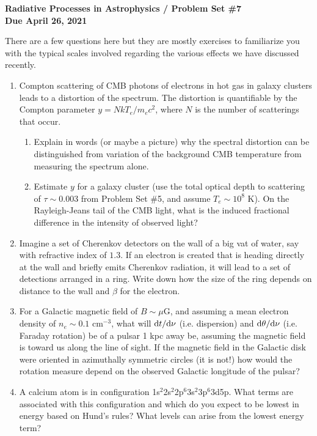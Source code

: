 \documentclass[11pt, preprint]{article}
\begin{document}
\begin{center}
  {\bf Radiative Processes in Astrophysics / Problem Set \#7 \\
    Due April 26, 2021}
\end{center}

There are a few questions here but they are mostly exercises to
familiarize you with the typical scales involved regarding the various
effects we have discussed recently.

\begin{enumerate}
\item Compton scattering of CMB photons of electrons in hot gas in
  galaxy clusters leads to a distortion of the spectrum. The
  distortion is quantifiable by the Compton parameter $y=N kT_e /
  m_ec^2$, where $N$ is the number of scatterings that occur.
  \begin{enumerate}
    \item Explain in words (or maybe a picture) why the spectral
      distortion can be distinguished from variation of the background
      CMB temperature from measuring the spectrum alone.
    \item Estimate $y$ for a galaxy cluster (use the total optical
      depth to scattering of $\tau\sim 0.003$ from Problem Set \#5,
      and assume $T_e\sim 10^8$ K). On the Rayleigh-Jeans tail of the
      CMB light, what is the induced fractional difference in the
      intensity of observed light? 
  \end{enumerate}
\item Imagine a set of Cherenkov detectors on the wall of a big vat of
  water, say with refractive index of $1.3$. If an electron is created
  that is heading directly at the wall and briefly emits Cherenkov
  radiation, it will lead to a set of detections arranged in a
  ring. Write down how the size of the ring depends on distance to the
  wall and $\beta$ for the electron. 
\item For a Galactic magnetic field of $B\sim \mu$G, and assuming a
  mean electron density of $n_e \sim 0.1$ cm$^{-3}$, what will ${\rm
    d}t/{\rm d}\nu$ (i.e. dispersion) and ${\rm d}\theta/{\rm d}\nu$
  (i.e. Faraday rotation) be of a pulsar 1 kpc away be, assuming the
  magnetic field is toward us along the line of sight. If the magnetic
  field in the Galactic disk were oriented in azimuthally symmetric
  circles (it is not!) how would the rotation measure depend on the
  observed Galactic longitude of the pulsar?
\item A calcium atom is in configuration
  1s$^2$2s$^2$2p$^6$3s$^2$3p$^6$3d5p. What terms are associated with
  this configuration and which do you expect to be lowest in energy
  based on Hund's rules? What levels can arise from the lowest energy
  term?
\end{enumerate}
\end{document}
